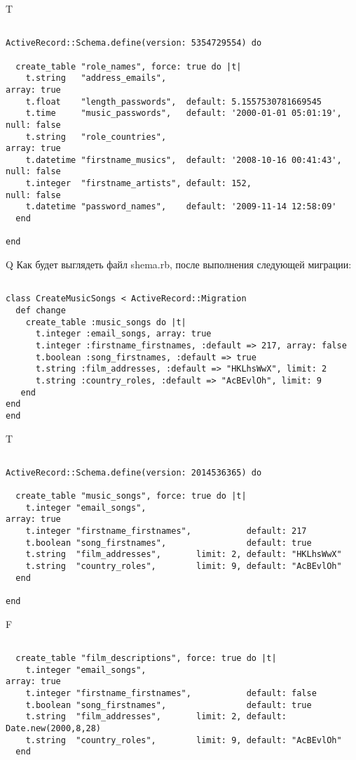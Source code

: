 T
\begin{verbatim}

ActiveRecord::Schema.define(version: 5354729554) do

  create_table "role_names", force: true do |t|
    t.string   "address_emails",                                                 array: true
    t.float    "length_passwords",  default: 5.1557530781669545
    t.time     "music_passwords",   default: '2000-01-01 05:01:19', null: false
    t.string   "role_countries",                                                 array: true
    t.datetime "firstname_musics",  default: '2008-10-16 00:41:43', null: false
    t.integer  "firstname_artists", default: 152,                   null: false
    t.datetime "password_names",    default: '2009-11-14 12:58:09'
  end

end
\end{verbatim}

Q
Как будет выглядеть файл shema.rb, после выполнения следующей миграции:

\begin{verbatim}

class CreateMusicSongs < ActiveRecord::Migration 
  def change 
    create_table :music_songs do |t| 
      t.integer :email_songs, array: true
      t.integer :firstname_firstnames, :default => 217, array: false
      t.boolean :song_firstnames, :default => true
      t.string :film_addresses, :default => "HKLhsWwX", limit: 2
      t.string :country_roles, :default => "AcBEvlOh", limit: 9
   end
end
end
\end{verbatim}

T
\begin{verbatim}

ActiveRecord::Schema.define(version: 2014536365) do

  create_table "music_songs", force: true do |t|
    t.integer "email_songs",                                         array: true
    t.integer "firstname_firstnames",           default: 217
    t.boolean "song_firstnames",                default: true
    t.string  "film_addresses",       limit: 2, default: "HKLhsWwX"
    t.string  "country_roles",        limit: 9, default: "AcBEvlOh"
  end

end
\end{verbatim}


F
\begin{verbatim}

  create_table "film_descriptions", force: true do |t|
    t.integer "email_songs",                                         array: true
    t.integer "firstname_firstnames",           default: false
    t.boolean "song_firstnames",                default: true
    t.string  "film_addresses",       limit: 2, default: Date.new(2000,8,28)
    t.string  "country_roles",        limit: 9, default: "AcBEvlOh"
  end

\end{verbatim}

